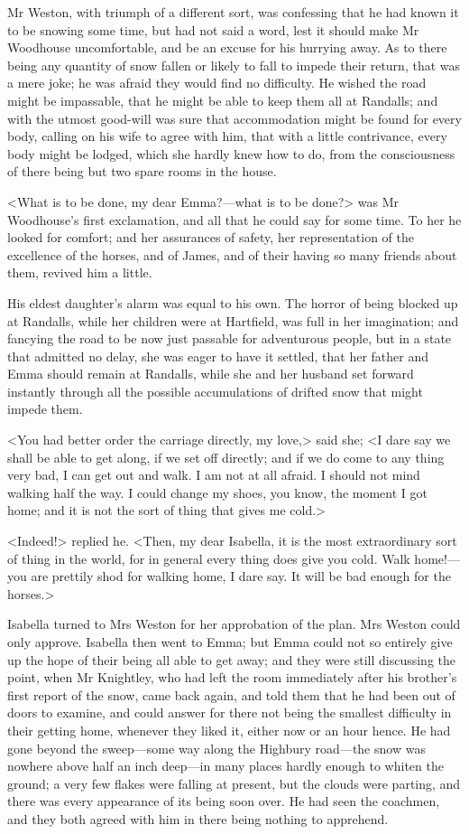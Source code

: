 Mr Weston, with triumph of a different sort, was confessing that he had known it to be snowing some time, but had not said a word, lest it should make Mr Woodhouse uncomfortable, and be an excuse for his hurrying away. As to there being any quantity of snow fallen or likely to fall to impede their return, that was a mere joke; he was afraid they would find no difficulty. He wished the road might be impassable, that he might be able to keep them all at Randalls; and with the utmost good-will was sure that accommodation might be found for every body, calling on his wife to agree with him, that with a little contrivance, every body might be lodged, which she hardly knew how to do, from the consciousness of there being but two spare rooms in the house.

<What is to be done, my dear Emma?—what is to be done?> was Mr Woodhouse's first exclamation, and all that he could say for some time. To her he looked for comfort; and her assurances of safety, her representation of the excellence of the horses, and of James, and of their having so many friends about them, revived him a little.

His eldest daughter's alarm was equal to his own. The horror of being blocked up at Randalls, while her children were at Hartfield, was full in her imagination; and fancying the road to be now just passable for adventurous people, but in a state that admitted no delay, she was eager to have it settled, that her father and Emma should remain at Randalls, while she and her husband set forward instantly through all the possible accumulations of drifted snow that might impede them.

<You had better order the carriage directly, my love,> said she; <I dare say we shall be able to get along, if we set off directly; and if we do come to any thing very bad, I can get out and walk. I am not at all afraid. I should not mind walking half the way. I could change my shoes, you know, the moment I got home; and it is not the sort of thing that gives me cold.>

<Indeed!> replied he. <Then, my dear Isabella, it is the most extraordinary sort of thing in the world, for in general every thing does give you cold. Walk home!—you are prettily shod for walking home, I dare say. It will be bad enough for the horses.>

Isabella turned to Mrs Weston for her approbation of the plan. Mrs Weston could only approve. Isabella then went to Emma; but Emma could not so entirely give up the hope of their being all able to get away; and they were still discussing the point, when Mr Knightley, who had left the room immediately after his brother's first report of the snow, came back again, and told them that he had been out of doors to examine, and could answer for there not being the smallest difficulty in their getting home, whenever they liked it, either now or an hour hence. He had gone beyond the sweep—some way along the Highbury road—the snow was nowhere above half an inch deep—in many places hardly enough to whiten the ground; a very few flakes were falling at present, but the clouds were parting, and there was every appearance of its being soon over. He had seen the coachmen, and they both agreed with him in there being nothing to apprehend.

